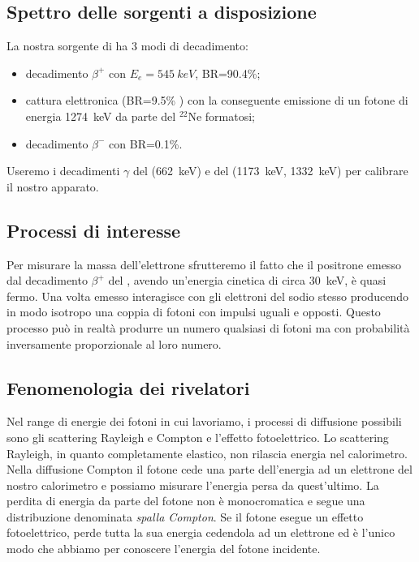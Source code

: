 \subsection{Spettro delle sorgenti a disposizione}

La nostra sorgente di \na{} ha 3 modi di decadimento:
\begin{itemize}
\item decadimento $\beta^+$ con $E_e=\SI{545}{keV}$, BR=90.4\%;
\item cattura elettronica (BR=9.5\% ) con la conseguente emissione di un fotone di energia \SI{1274}{keV} da parte del $^{22}$Ne formatosi;
\item decadimento $\beta^-$ con BR=0.1\%.
\end{itemize}

Useremo i decadimenti $\gamma$ del \cs{} (\SI{662}{keV}) e del \co{} (\SI{1173}{keV}, \SI{1332}{keV}) per calibrare il nostro apparato.

\subsection{Processi di interesse}

Per misurare la massa dell'elettrone sfrutteremo il fatto che il positrone emesso dal decadimento $\beta^+$ del \na{}, avendo un'energia cinetica di circa \SI{30}{keV}, è quasi fermo.
Una volta emesso interagisce con gli elettroni del sodio stesso producendo in modo isotropo una coppia di fotoni con impulsi uguali e opposti. Questo processo può in realtà produrre un numero qualsiasi di fotoni ma con probabilità inversamente proporzionale al loro numero.


\subsection{Fenomenologia dei rivelatori}


Nel range di energie dei fotoni in cui lavoriamo, i processi di diffusione possibili sono gli scattering Rayleigh e Compton e l'effetto fotoelettrico.
Lo scattering Rayleigh, in quanto completamente elastico, non rilascia energia nel calorimetro.
Nella diffusione Compton il fotone cede una parte dell'energia ad un elettrone del nostro calorimetro e possiamo misurare l'energia persa da quest'ultimo. La perdita di energia da parte del fotone non è monocromatica e segue una distribuzione denominata \emph{spalla Compton}.
Se il fotone esegue un effetto fotoelettrico, perde tutta la sua energia cedendola ad un elettrone ed è l'unico modo che abbiamo per conoscere l'energia del fotone incidente.

